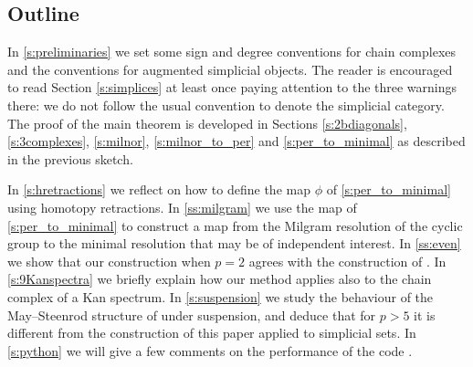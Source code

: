 \subsection{Outline}

In \cref{s:preliminaries} we set some sign and degree conventions for chain complexes and the conventions for augmented simplicial objects. The reader is encouraged to read Section \cref{s:simplices} at least once paying attention to the three warnings there: we do not follow the usual convention to denote the simplicial category.
The proof of the main theorem is developed in Sections \ref{s:2bdiagonals}, \ref{s:3complexes}, \ref{s:milnor}, \ref{s:milnor_to_per} and \ref{s:per_to_minimal} as described in the previous sketch.

In \cref{s:hretractions} we reflect on how to define the map $\phi$ of \cref{s:per_to_minimal} using homotopy retractions.
In \cref{ss:milgram} we use the map of \cref{s:per_to_minimal} to construct a map from the Milgram resolution of the cyclic group to the minimal resolution that may be of independent interest.
In \cref{ss:even} we show that our construction when $p=2$ agrees with the construction of \cite{medina2021fast_sq}.
In \cref{s:9Kanspectra} we briefly explain how our method applies also to the chain complex of a Kan spectrum.
In \cref{s:suspension} we study the behaviour of the May--Steenrod structure of \cite{medina2021may_st} under suspension, and deduce that for $p>5$ it is different from the construction of this paper applied to simplicial sets.
In \cref{s:python} we will give a few comments on the performance of the code \cite{github-oddp}.